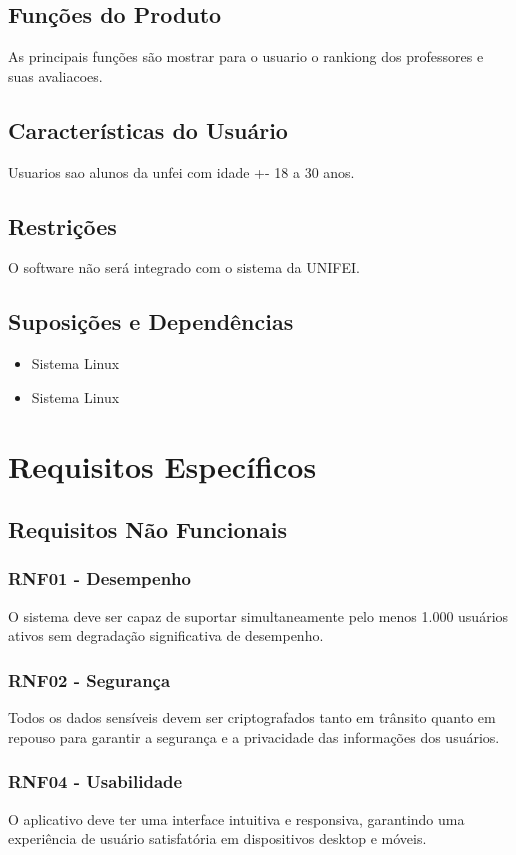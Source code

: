 \documentclass[12pt]{article}
\begin{document}
\subsection{Funções do Produto}
\hspace{1cm} As principais funções são mostrar para o usuario o rankiong dos professores e suas avaliacoes.
\subsection{Características do Usuário}
\hspace{1cm}Usuarios sao alunos da unfei com idade +- 18 a 30 anos.
\subsection{Restrições}
\hspace{1cm} O software não será integrado com o sistema da UNIFEI.
\subsection{Suposições e Dependências}
\begin{itemize}
    \item Sistema Linux 
    \item Sistema Linux 
\end{itemize}

\section{Requisitos Específicos}
\subsection{Requisitos Não Funcionais}
    \subsubsection{RNF01 - Desempenho}
        O sistema deve ser capaz de suportar simultaneamente pelo menos 1.000 usuários ativos sem degradação significativa de desempenho.
    \subsubsection{RNF02 - Segurança}
        Todos os dados sensíveis devem ser criptografados tanto em trânsito quanto em repouso para garantir a segurança e a privacidade das informações dos usuários.
    \subsubsection{RNF04 - Usabilidade}
        O aplicativo deve ter uma interface intuitiva e responsiva, garantindo uma experiência de usuário satisfatória em dispositivos desktop e móveis.
\end{document}
